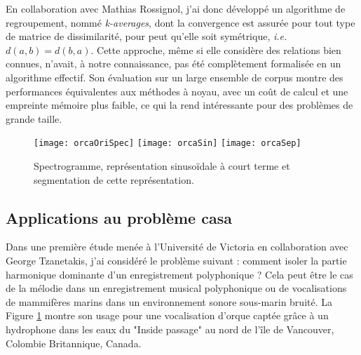 En collaboration avec Mathias Rossignol, j'ai donc développé un algorithme de regroupement, nommé \textsl{k-averages}, dont la convergence est assurée pour tout type de matrice de dissimilarité, pour peut qu'elle soit symétrique, \textit{i.e.} $d(a, b) = d(b,a)$. Cette approche, même si elle considère des relations bien connues, n'avait, à notre connaissance, pas été complètement formalisée  en un algorithme effectif. Son évaluation sur un large ensemble de corpus\cite{UCRArchive} montre des performances équivalentes aux méthodes à noyau, avec un coût de calcul et une empreinte mémoire plus faible, ce qui la rend intéressante pour des problèmes de grande taille.~\cite{rossignol2018efficient}

\begin{figure}[t]
  \texttt{[image: orcaOriSpec]}
  \texttt{[image: orcaSin]}
  \texttt{[image: orcaSep]}
  \label{fig:orca}
  \caption{Spectrogramme, représentation sinusoïdale à court terme et segmentation de cette représentation.}
\end{figure}

\subsection{Applications au problème casa}


Dans une première étude menée à l'Université de Victoria en collaboration avec George Tzanetakis, j'ai considéré le problème suivant : comment isoler la partie harmonique dominante d'un enregistrement polyphonique ? Cela peut être le cas de la mélodie dans un enregistrement musical polyphonique ou de vocalisations de mammifères marins dans un environnement sonore sous-marin bruité. La Figure \ref{fig:orca} montre son usage pour une vocalisation d'orque captée grâce à un hydrophone dans les eaux du "Inside passage" au nord de l'île de Vancouver, Colombie Britannique, Canada.

